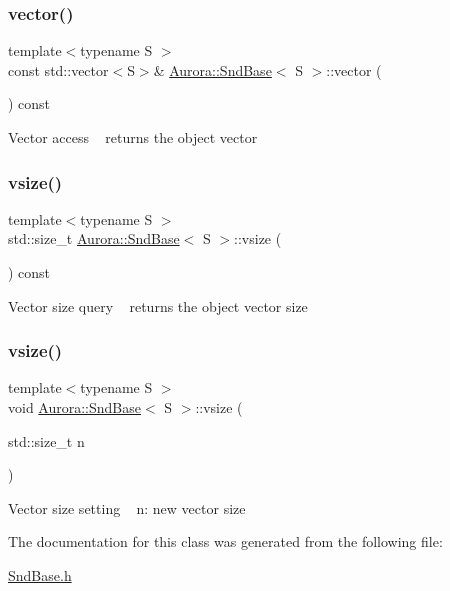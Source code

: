 \mbox{\label{class_aurora_1_1_snd_base_acf9171085003208901e23c1f50520345}} 
\subsubsection{\texorpdfstring{vector()}{vector()}}
{\footnotesize\ttfamily template$<$typename S $>$ \\
const std\+::vector$<$S$>$\& \hyperlink{class_aurora_1_1_snd_base}{Aurora\+::\+Snd\+Base}$<$ S $>$\+::vector (\begin{DoxyParamCaption}{ }\end{DoxyParamCaption}) const\hspace{0.3cm}{\ttfamily [inline]}}

Vector access ~\newline
returns the object vector \mbox{\label{class_aurora_1_1_snd_base_af9e21aaf411b17f7a8221c991ce5d291}} 
\subsubsection{\texorpdfstring{vsize()}{vsize()}\hspace{0.1cm}{\footnotesize\ttfamily [1/2]}}
{\footnotesize\ttfamily template$<$typename S $>$ \\
std\+::size\+\_\+t \hyperlink{class_aurora_1_1_snd_base}{Aurora\+::\+Snd\+Base}$<$ S $>$\+::vsize (\begin{DoxyParamCaption}{ }\end{DoxyParamCaption}) const\hspace{0.3cm}{\ttfamily [inline]}}

Vector size query ~\newline
returns the object vector size \mbox{\label{class_aurora_1_1_snd_base_a88dacba995eef179f2fc97e11a331913}} 
\subsubsection{\texorpdfstring{vsize()}{vsize()}\hspace{0.1cm}{\footnotesize\ttfamily [2/2]}}
{\footnotesize\ttfamily template$<$typename S $>$ \\
void \hyperlink{class_aurora_1_1_snd_base}{Aurora\+::\+Snd\+Base}$<$ S $>$\+::vsize (\begin{DoxyParamCaption}\item[{std\+::size\+\_\+t}]{n }\end{DoxyParamCaption})\hspace{0.3cm}{\ttfamily [inline]}}

Vector size setting ~\newline
n\+: new vector size 

The documentation for this class was generated from the following file\+:\begin{DoxyCompactItemize}
\item 
\hyperlink{_snd_base_8h}{Snd\+Base.\+h}\end{DoxyCompactItemize}
